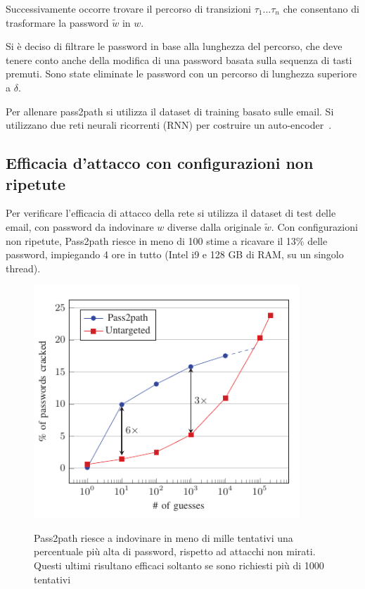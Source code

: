 Successivamente occorre trovare il percorso di transizioni  $\tau_1...\tau_n$ che consentano di trasformare la password $\tilde{w}$ in $w$.

Si è deciso di filtrare le password in base alla lunghezza del percorso, che deve tenere conto anche della modifica di una password basata sulla sequenza di tasti premuti. Sono state eliminate le password con un percorso di lunghezza superiore a $\delta$.

Per allenare pass2path si utilizza il dataset di training basato sulle email.
Si utilizzano due reti neurali ricorrenti (RNN) per costruire un auto-encoder~\cite{Sherstinsky_2020}.

\subsection{Efficacia d'attacco con configurazioni non ripetute}
\label{sec:attacco conf non ripetute}
Per verificare l'efficacia di attacco della rete si utilizza il dataset di test delle email, con password da indovinare $w$ diverse dalla originale $\tilde{w}$.
Con configurazioni non ripetute, Pass2path riesce in meno di 100 stime a ricavare
il 13\% delle password, impiegando 4 ore in tutto (Intel i9 e 128 GB di RAM, su un singolo thread).
\begin{figure}[h]
    \centering
    \includegraphics[width=10cm]{./immagini/pass2path.png}
    \label{pass2path}
    \caption{Pass2path riesce a indovinare in meno di mille tentativi una percentuale più alta di password, rispetto ad attacchi non mirati. Questi ultimi risultano efficaci soltanto se sono richiesti più di 1000 tentativi~\cite{biijeta}}
\end{figure}

